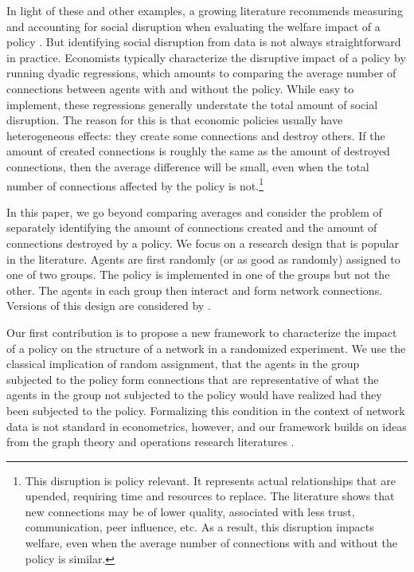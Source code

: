 \documentclass[12pt]{article}
\theoremstyle{definition}
\begin{document}
In light of these and other examples, a growing literature recommends measuring and accounting for social disruption when evaluating the welfare impact of a policy \citep[see, for instance,][]{banerjee2021changes,jackson2021inequality}. But identifying social disruption from data is not always straightforward in practice. Economists typically characterize the disruptive impact of a policy by running dyadic regressions, which amounts to comparing the average number of connections between agents with and without the policy. While easy to implement, these regressions generally understate the total amount of social disruption. The reason for this is that economic policies usually have heterogeneous effects: they create some connections and destroy others. If the amount of created connections is roughly the same as the amount of destroyed connections, then the average difference will be small, even when the total number of connections affected by the policy is not.\footnote{This disruption is policy relevant. It represents actual relationships that are upended, requiring time and resources to replace. The literature shows that new connections may be of lower quality, associated with less trust, communication, peer influence, etc. As a result, this disruption impacts welfare, even when the average number of connections with and without the policy is similar.}  


In this paper, we go beyond comparing averages and consider the problem of separately identifying the amount of connections created and the amount of connections destroyed by a policy. We focus on a research design that is popular in the literature. Agents are first randomly (or as good as randomly) assigned to one of two groups. The policy is implemented in one of the groups but not the other. The agents in each group then interact and form network connections. Versions of this design are considered by \cite{carrell2013natural,feigenberg2013economic,graham2014complementarity,cai2015social,bajari2021multiple,banerjee2021changes,comola2021treatment,comola2023interplay, hess2021development,johari2022experimental}.  

Our first contribution is to propose a new framework to characterize the impact of a policy on the structure of a network in a randomized experiment. We use the classical implication of random assignment, that the agents in the group subjected to the policy form connections that are representative of what the agents in the group not subjected to the policy would have realized had they been subjected to the policy. Formalizing this condition in the context of network data is not standard in econometrics, however, and our framework builds on ideas from the graph theory and operations research literatures \cite[see, generally,][]{lovasz2012large,cela2013quadratic}.   
\end{document}

